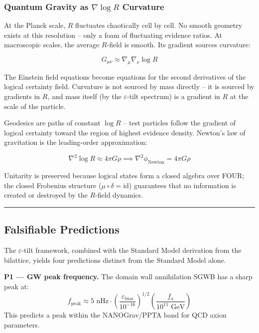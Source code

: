 \documentclass[12pt,a4paper]{article}
\begin{document}
\hypertarget{quantum-gravity-as-nabla-log-r-curvature}{%
\subsubsection{\texorpdfstring{Quantum Gravity as \(\nabla \log R\)
Curvature}{Quantum Gravity as \textbackslash nabla \textbackslash log R Curvature}}\label{quantum-gravity-as-nabla-log-r-curvature}}

At the Planck scale, \(R\) fluctuates chaotically cell by cell. No
smooth geometry exists at this resolution -- only a foam of fluctuating
evidence ratios. At macroscopic scales, the average \(R\)-field is
smooth. Its gradient sources curvature:

\[G_{\mu\nu} \approx \nabla_\mu \nabla_\nu \log R\]

The Einstein field equations become equations for the second derivatives
of the logical certainty field. Curvature is not sourced by mass
directly -- it is sourced by gradients in \(R\), and mass itself (by the
\(\varepsilon\)-tilt spectrum) is a gradient in \(R\) at the scale of
the particle.

Geodesics are paths of constant \(\log R\) -- test particles follow the
gradient of logical certainty toward the region of highest evidence
density. Newton's law of gravitation is the leading-order approximation:

\[\nabla^2 \log R \approx 4\pi G \rho \implies \nabla^2 \phi_\text{Newton} = 4\pi G \rho\]

Unitarity is preserved because logical states form a closed algebra over
FOUR; the closed Frobenius structure
(\(\mu \circ \delta = \mathrm{id}\)) guarantees that no information is
created or destroyed by the \(R\)-field dynamics.

\begin{center}\rule{0.5\linewidth}{0.5pt}\end{center}

\hypertarget{falsifiable-predictions}{%
\subsection{Falsifiable Predictions}\label{falsifiable-predictions}}

The \(\varepsilon\)-tilt framework, combined with the Standard Model
derivation from the bilattice, yields four predictions distinct from the
Standard Model alone.

\textbf{P1 --- GW peak frequency.} The domain wall annihilation SGWB has
a sharp peak at:
\[f_\text{peak} \approx 5 \text{ nHz} \cdot \left(\frac{\varepsilon_\text{bias}}{10^{-16}}\right)^{1/2} \left(\frac{f_a}{10^{11}\text{ GeV}}\right)\]
This predicts a peak within the NANOGrav/PPTA band for QCD axion
parameters.
\end{document}
